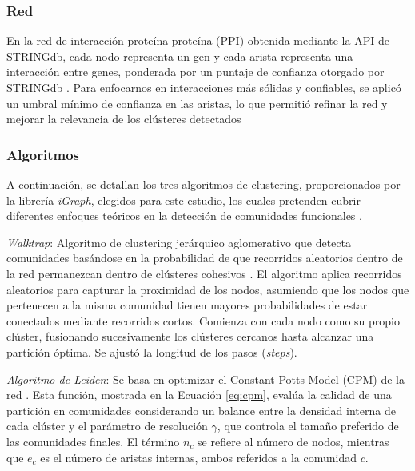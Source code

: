 \subsubsection{Red}

En la red de interacción proteína-proteína (PPI) obtenida mediante la API de STRINGdb, cada nodo representa un gen y cada arista representa una interacción entre genes, ponderada por un puntaje de confianza otorgado por STRINGdb \cite{szklarczyk2023stringdb}. Para enfocarnos en interacciones más sólidas y confiables, se aplicó un umbral mínimo de confianza en las aristas, lo que permitió refinar la red y mejorar la relevancia de los clústeres detectados 


\subsubsection{Algoritmos}
\label{sec:algoritmos}

A continuación, se detallan los tres algoritmos de clustering, proporcionados por la librería \textit{iGraph}, elegidos para este estudio, los cuales pretenden cubrir diferentes enfoques teóricos en la detección de comunidades funcionales \cite{igraph}.  

\textit{Walktrap}: Algoritmo de clustering jerárquico aglomerativo que detecta comunidades basándose en la probabilidad de que recorridos aleatorios dentro de la red permanezcan dentro de clústeres cohesivos \cite{pons2005walktrap}. El algoritmo aplica recorridos aleatorios para capturar la proximidad de los nodos, asumiendo que los nodos que pertenecen a la misma comunidad tienen mayores probabilidades de estar conectados mediante recorridos cortos. Comienza con cada nodo como su propio clúster, fusionando sucesivamente los clústeres cercanos hasta alcanzar una partición óptima. Se ajustó la longitud de los pasos (\textit{steps}).

\textit{Algoritmo de Leiden}: Se basa en optimizar el Constant Potts Model (CPM) de la red \cite{traag2019leiden,constantplottsmodel}. Esta función, mostrada en la Ecuación \ref{eq:cpm}, evalúa la calidad de una partición en comunidades considerando un balance entre la densidad interna de cada clúster y el parámetro de resolución \(\gamma\), que controla el tamaño preferido de las comunidades finales. El término \(n_c\) se refiere al número de nodos, mientras que \(e_c\) es el número de aristas internas, ambos referidos a la comunidad \(c\).

